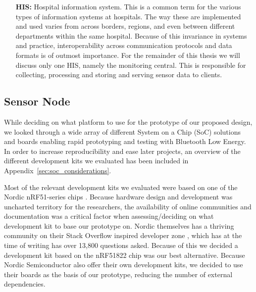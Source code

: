 \begin{itemize}
  \item[\textbf{HIS:}] Hospital information system. This is a common term for the various types of information systems at hospitals. The way these are implemented and used varies from across borders, regions, and even between different departments within the same hospital. Because of this invariance in systems and practice, interoperability across communication protocols and data formats is of outmost importance. For the remainder of this thesis we will discuss only one HIS, namely the monitoring central. This is responsible for collecting, processing and storing and serving sensor data to clients.

\end{itemize}



\subsection{Sensor Node} %
\label{sub:node}

While deciding on what platform to use for the prototype of our proposed design, we looked through a wide array of different System on a Chip (SoC) solutions and boards enabling rapid prototyping and testing with Bluetooth Low Energy. In order to increase reproducibility and ease later projects, an overview of the different development kits we evaluated has been included in Appendix~\ref{sec:soc_considerations}.

Most of the relevant development kits we evaluated were based on one of the Nordic nRF51-series chips \cite{newRef:36, newRef:36:2}. Because hardware design and development was uncharted territory for the researchers, the availability of online communities and documentation was a critical factor when assessing/deciding on what development kit to base our prototype on. Nordic themselves has a thriving community on their Stack Overflow inspired developer zone \cite{newRef:50}, which has at the time of writing has over 13,800 questions asked. Because of this we decided a development kit based on the  nRF51822 chip was our best alternative. Because Nordic Semiconductor also offer their own development kits, we decided to use their boards as the basis of our prototype, reducing the number of external dependencies.

